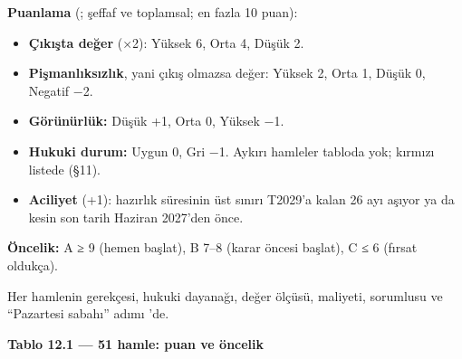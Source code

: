 \textbf{Puanlama} (; şeffaf ve toplamsal; en fazla 10 puan):

\begin{itemize}
\tightlist
\item
  \textbf{Çıkışta değer} (×2): Yüksek 6, Orta 4, Düşük 2.
\item
  \textbf{Pişmanlıksızlık}, yani çıkış olmazsa değer: Yüksek 2, Orta 1, Düşük 0, Negatif −2.
\item
  \textbf{Görünürlük:} Düşük +1, Orta 0, Yüksek −1.
\item
  \textbf{Hukuki durum:} Uygun 0, Gri −1. Aykırı hamleler tabloda yok; kırmızı listede (§11).
\item
  \textbf{Aciliyet} (+1): hazırlık süresinin üst sınırı T2029'a kalan 26 ayı aşıyor ya da kesin son tarih Haziran 2027'den önce.
\end{itemize}

\textbf{Öncelik:} A ≥ 9 (hemen başlat), B 7--8 (karar öncesi başlat), C ≤ 6 (fırsat oldukça).

Her hamlenin gerekçesi, hukuki dayanağı, değer ölçüsü, maliyeti, sorumlusu ve ``Pazartesi sabahı'' adımı 'de.


\textbf{Tablo 12.1 --- 51 hamle: puan ve öncelik}

\nopagebreak[4]

\begingroup\gbtablo\footnotesize

